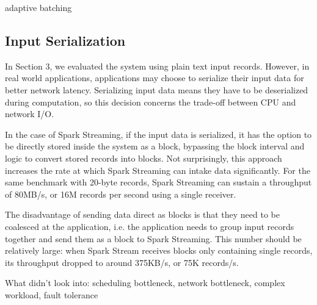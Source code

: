 adaptive batching

\subsection{Input Serialization}
In Section 3, we evaluated the system using plain text input records. However, in real world applications, applications may choose to serialize their input data for better network latency. Serializing input data means they have to be deserialized during computation, so this decision concerns the trade-off between CPU and network I/O.

In the case of Spark Streaming, if the input data is serialized, it has the option to be directly stored inside the system as a block, bypassing the block interval and logic to convert stored records into blocks. Not surprisingly, this approach increases the rate at which Spark Streaming can intake data significantly. For the same benchmark with 20-byte records, Spark Streaming can sustain a throughput of 80MB/s, or 16M records per second using a single receiver.

The disadvantage of sending data direct as blocks is that they need to be coalesced at the application, i.e. the application needs to group input records together and send them as a block to Spark Streaming. This number should be relatively large: when Spark Stream receives blocks only containing single records, its throughput dropped to around 375KB/s, or 75K records/s.




What didn't look into: scheduling bottleneck, network bottleneck, complex workload, fault tolerance